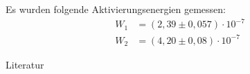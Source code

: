 Es wurden folgende Aktivierungsenergien gemessen:
\begin{align}
W_1&=(2,39    \pm 0,057)\cdot 10^{-7}\\
W_2&=(4,20	\pm 0,08)\cdot 10^{-7}
\end{align}



\parskip 340pt
\Large{Literatur}\\\\





